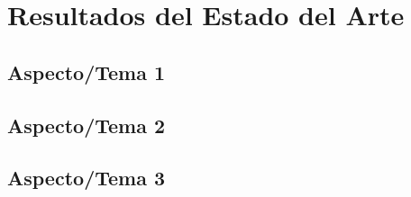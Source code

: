 \chapter{Resultados del Estado del Arte}
\section{Aspecto/Tema 1}
\section{Aspecto/Tema 2}
\section{Aspecto/Tema 3}